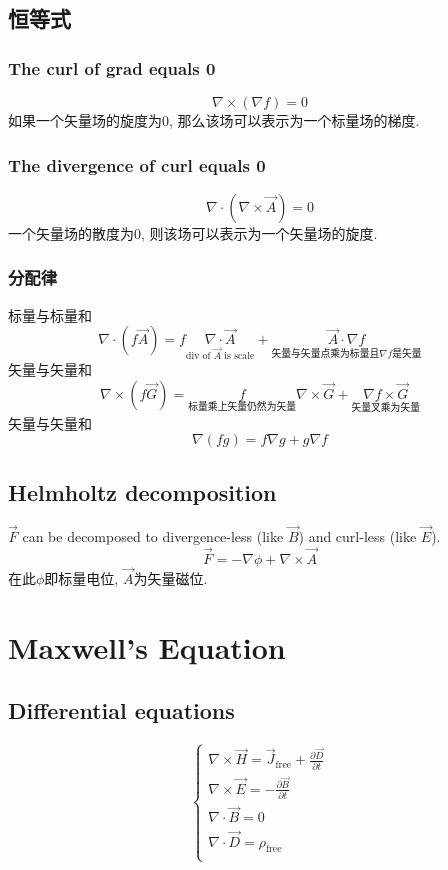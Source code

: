 \documentclass[a4paper]{report}
\begin{document}
\section{恒等式}
\subsection{The curl of grad equals 0}
$$\nabla\times (\nabla f)=0$$
如果一个矢量场的旋度为0, 那么该场可以表示为一个标量场的梯度. 
\subsection{The divergence of curl equals 0}
$$\nabla\cdot (\nabla\times \vec{A})=0$$
一个矢量场的散度为0, 则该场可以表示为一个矢量场的旋度. 
\subsection{分配律}
标量与标量和
$$\nabla\cdot (f\vec{A})=f \underset{\text{div of $\vec{A}$ is scale}}{\nabla\cdot \vec{A}} + \underset{\text{矢量与矢量点乘为标量且$\nabla f$是矢量}}{\vec{A}\cdot \nabla f}$$
矢量与矢量和
$$\nabla\times (f\vec{G})=\underset{\text{标量乘上矢量仍然为矢量}}{f} \nabla\times \vec{G}+\underset{\text{矢量叉乘为矢量}}{\nabla f \times \vec{G}} $$
矢量与矢量和
$$\nabla(fg)=f\nabla g+g\nabla f$$
\section{Helmholtz decomposition}
$ \vec{F} $ can be decomposed to divergence-less (like $ \vec{B} $) and curl-less (like $ \vec{E} $). 
$$ \vec{F}= -\nabla\phi+\nabla\times\vec{A} $$
在此$\phi$即标量电位, $\vec{A}$为矢量磁位. 
\chapter{Maxwell's Equation}
\section{Differential equations}
$$
\begin{cases}
    \nabla\times \vec{H} =\vec{J}_{\text{free}}+\frac{\partial \vec{D} }{\partial t}\\
    \nabla\times \vec{E} =-\frac{\partial \vec{B} }{\partial t}\\
    \nabla\cdot \vec{B} =0\\
    \nabla\cdot \vec{D} =\rho_{\text{free}}\\
\end{cases}
$$
\end{document}
